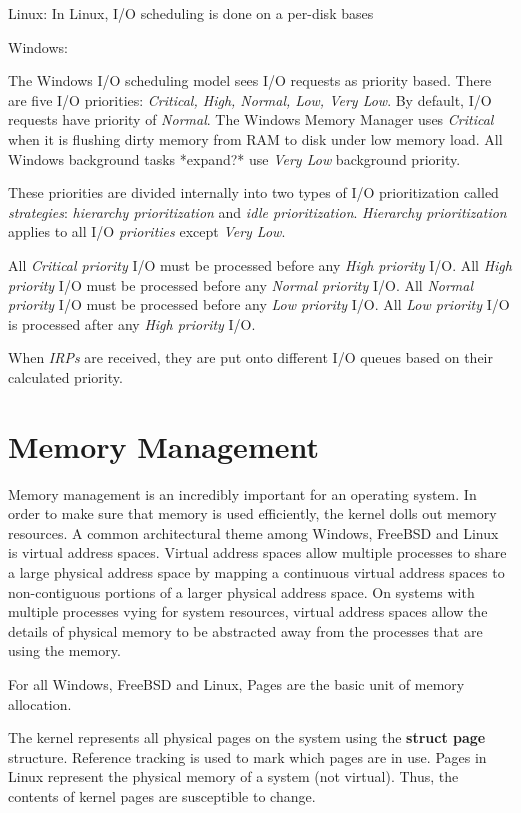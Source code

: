 \documentclass[onecolumn,10pt]{IEEETran}
\begin{document}
Linux:
  In Linux, I/O scheduling is done on a per-disk bases

Windows:

 The Windows  I/O scheduling model sees I/O requests as priority based.  There are five I/O priorities: \textit{Critical, High, Normal, Low, Very Low}.  By default, I/O requests have priority of \textit{Normal}.  The Windows Memory Manager uses \textit{Critical} when it is flushing dirty memory from RAM to disk under low memory load.  All Windows background tasks *expand?* use \textit{Very Low} background priority.
 
 These priorities are divided internally into two types of I/O prioritization called \textit{strategies}: \textit{hierarchy prioritization} and \textit{idle prioritization}. \textit{Hierarchy prioritization} applies to all I/O \textit{priorities} except \textit{Very Low}. 

All \textit{Critical priority} I/O must be processed before any \textit{High priority} I/O.  All \textit{High priority} I/O must be processed before any \textit{Normal priority} I/O.  All \textit{Normal priority} I/O must be processed before any \textit{Low priority} I/O.  All \textit{Low priority} I/O is processed after any \textit{High priority} I/O.

When \textit{IRPs} are received, they are put onto different I/O queues based on their calculated priority.

\section{Memory Management}

Memory management is an incredibly important for an operating system.  In order to make sure that memory is used efficiently, the kernel dolls out memory resources.  A common architectural theme among Windows, FreeBSD and Linux is virtual address spaces.  Virtual address spaces allow multiple processes to share a large physical address space by mapping a continuous virtual address spaces to non-contiguous portions of a larger physical address space.  On systems with multiple processes vying for system resources, virtual address spaces allow the details of physical memory to be abstracted away from the processes that are using the memory.

For all Windows, FreeBSD and Linux, Pages are the basic unit of memory allocation.

The kernel represents all physical pages on the system using the \textbf{struct page} structure.
Reference tracking is used to mark which pages are in use.  Pages in Linux represent the physical memory of a system (not virtual).  Thus, the contents of kernel pages are susceptible to change.
\end{document}
